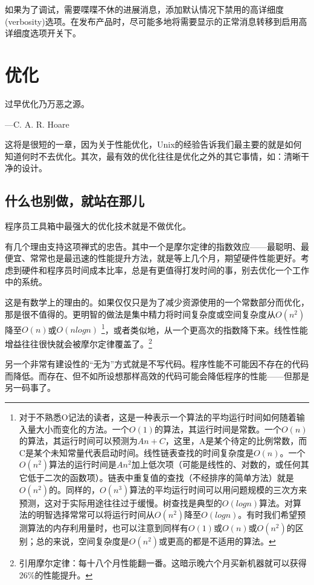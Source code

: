 \documentclass[12pt,oneside]{book}
\begin{document}
如果为了调试，需要喋喋不休的进展消息，添加默认情况下禁用的高详细度(verbosity)选项。在发布产品时，尽可能多地将需要显示的正常消息转移到启用高详细度选项开关下。



\chapter{优化}
\begin{flushright}
过早优化乃万恶之源。

{\hfill —C. A. R. Hoare}
\end{flushright}
    
这将是很短的一章，因为关于性能优化，Unix的经验告诉我们最主要的就是如何知道何时不去优化。其次，最有效的优化往往是优化之外的其它事情，如：清晰干净的设计。

\section{什么也别做，就站在那儿}
程序员工具箱中最强大的优化技术就是不做优化。

有几个理由支持这项禅式的忠告。其中一个是摩尔定律的指数效应——最聪明、最便宜、常常也是最迅速的性能提升方法，就是等上几个月，期望硬件性能更好。考虑到硬件和程序员时间成本比率，总是有更值得打发时间的事，别去优化一个工作中的系统。

这是有数学上的理由的。如果仅仅只是为了减少资源使用的一个常数部分而优化，那是很不值得的。更明智的做法是集中精力将时间复杂度或空间复杂度从$O(n^2)$降至$ O(n) $或$ O(n log n) $ \footnote{对于不熟悉O记法的读者，这是一种表示一个算法的平均运行时间如何随着输入量大小而变化的方法。一个$ O(1) $的算法，其运行时间是常数。一个$ O(n) $的算法，其运行时间可以预测为$ An + C $，这里，A是某个待定的比例常数，而C是某个未知常量代表启动时间。线性链表查找的时间复杂度是$ O(n) $。一个$ O(n^2) $算法的运行时间是$ An^2 $加上低次项（可能是线性的、对数的，或任何其它低于二次的函数项）。链表中重复值的查找（不经排序的简单方法）就是$ O(n^2) $的。同样的，$ O(n^3) $算法的平均运行时间可以用问题规模的三次方来预测，这对于实际用途往往过于缓慢。树查找是典型的$ O(log n) $算法。对算法的明智选择常常可以将运行时间从$O(n^2)$降至$ O(log n) $。有时我们希望预测算法的内存利用量时，也可以注意到同样有$ O(1) $或$ O(n) $或$O(n^2)$的区别；总的来说，空间复杂度是$O(n^2)$或更高的都是不适用的算法。}，或者类似地，从一个更高次的指数降下来。线性性能增益往往很快就会被摩尔定律覆盖了。\footnote{引用摩尔定律：每十八个月性能翻一番。这暗示晚六个月买新机器就可以获得26\%{}的性能提升。}

另一个非常有建设性的“无为”方式就是不写代码。程序性能不可能因不存在的代码而降低。而存在、但不如所设想那样高效的代码可能会降低程序的性能——但那是另一码事了。
\end{document}
